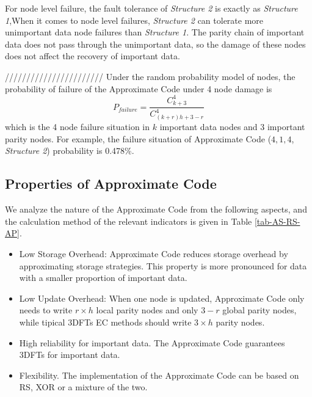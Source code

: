 \documentclass[sigconf]{acmart}
\begin{document}
For node level failure, the fault tolerance of \emph{Structure 2} is exactly as \emph{Structure 1},When it comes to node level failures, \emph{Structure 2} can tolerate more unimportant data node failures than \emph{Structure 1}. The parity chain of important data does not pass through the unimportant data, so the damage of these nodes does not affect the recovery of important data.

///////////////////////
Under the random probability model of nodes, the probability of failure of the Approximate Code under 4 node damage is
\begin{equation}
    P_{failure} = \frac{C_{k+3}^4}{C_{(k+r)h+3-r}^4}
\end{equation}
which is the 4 node failure situation in $k$ important data nodes and 3 important parity nodes. For example, the failure situation of Approximate Code ($4,1,4$, \emph{Structure 2}) probability is 0.478\%.
\fi

\subsection{Properties of Approximate Code}\label{properties}

We analyze the nature of the Approximate Code from the following aspects, and the calculation method of the relevant indicators is given in Table \ref{tab-AS-RS-AP}.
\begin{itemize}
    \item Low Storage Overhead: Approximate Code reduces storage overhead by approximating storage strategies. This property is more pronounced for data with a smaller proportion of important data.
    \item Low Update Overhead: When one node is updated, Approximate Code only needs to write $r \times h$ local parity nodes and only $3-r$ global parity nodes, while tipical 3DFTs EC methods should write $3 \times h$ parity nodes.
    \item High reliability for important data. The Approximate Code guarantees 3DFTs for important data.
    \item Flexibility. The implementation of the Approximate Code can be based on RS, XOR or a mixture of the two.
\end{itemize}
\end{document}
